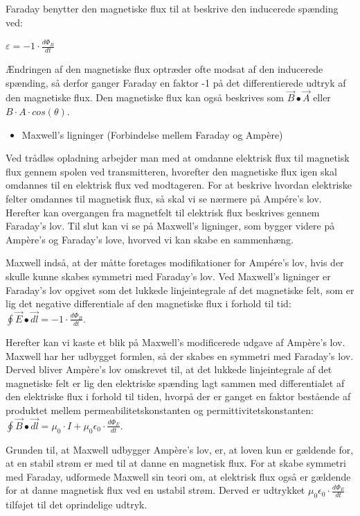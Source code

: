 Faraday benytter den magnetiske flux til at beskrive den inducerede spænding ved:

\centerline{$\varepsilon = -1 \cdot \frac{d \Phi_B}{dt}$}

Ændringen af den magnetiske flux optræder ofte modsat af den inducerede spænding, så derfor ganger Faraday en faktor -1 på det differentierede udtryk af den magnetiske flux. Den magnetiske flux kan også beskrives som $\vec{B} \bullet \vec{A}$ eller $B \cdot A \cdot cos(\theta)$.
\begin{itemize}
\item Maxwell's ligninger (Forbindelse mellem Faraday og Ampère)
\end{itemize}
Ved trådløs opladning arbejder man med at omdanne elektrisk flux til magnetisk flux gennem spolen ved transmitteren, hvorefter den magnetiske flux igen skal omdannes til en elektrisk flux ved modtageren. For at beskrive hvordan elektriske felter omdannes til magnetisk flux, så skal vi se nærmere på Ampére's lov. Herefter kan overgangen fra magnetfelt til elektrisk flux beskrives gennem Faraday's lov. Til slut kan vi se på Maxwell's ligninger, som bygger videre på Ampère's og Faraday's love, hvorved vi kan skabe en sammenhæng.

Maxwell indså, at der måtte foretages modifikationer for Ampére's lov, hvis der skulle kunne skabes symmetri med Faraday's lov. Ved Maxwell's ligninger er Faraday's lov opgivet som det lukkede linjeintegrale af det magnetiske felt, som er lig det negative differentiale af den magnetiske flux i forhold til tid: $\oint \vec{E} \bullet \vec{dl} = -1 \cdot \frac{d \Phi_B}{dt}$.

Herefter kan vi kaste et blik på Maxwell's modificerede udgave af Ampère's lov. Maxwell har her udbygget formlen, så der skabes en symmetri med Faraday's lov. Derved bliver Ampère's lov omskrevet til, at det lukkede linjeintegrale af det magnetiske felt er lig den elektriske spænding lagt sammen med differentialet af den elektriske flux i forhold til tiden, hvorpå der er ganget en faktor bestående af produktet mellem permeabilitetskonstanten og permittivitetskonstanten: $\oint \vec{B} \bullet \vec{dl} = \mu_0 \cdot I + \mu_0 \epsilon_0 \cdot \frac{d \Phi_E}{dt}$.

Grunden til, at Maxwell udbygger Ampère's lov, er, at loven kun er gældende for, at en stabil strøm er med til at danne en magnetisk flux. For at skabe symmetri med Faraday, udformede Maxwell sin teori om, at elektrisk flux også er gældende for at danne magnetisk flux ved en ustabil strøm. Derved er udtrykket $\mu_0 \epsilon_0 \cdot \frac{d \Phi_E}{dt}$ tilføjet til det oprindelige udtryk.
\newpage
